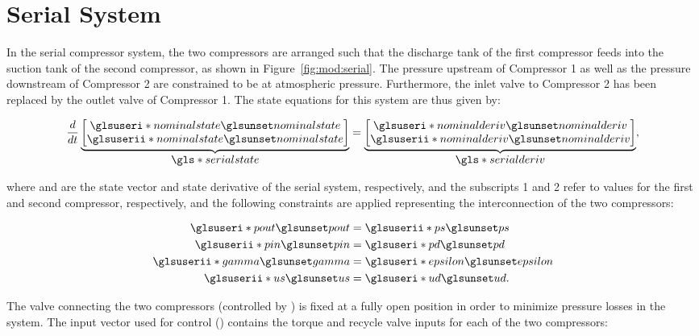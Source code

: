 \section{Serial System}
\label{sec:mod:serial}

In the serial compressor system, the two compressors are arranged such that the discharge tank of the first compressor feeds into the suction tank of the second compressor, as shown in Figure~\ref{fig:mod:serial}.
The pressure upstream of Compressor 1 as well as the pressure downstream of Compressor 2 are constrained to be at atmospheric pressure.
Furthermore, the inlet valve to Compressor 2 has been replaced by the outlet valve of Compressor 1. The state equations for this system are thus given by:

\begin{equation}
  \dt{}
  \ubrace{\begin{bmatrix}
    \gi{nominalstate}\\
    \gii{nominalstate}\\
  \end{bmatrix}}{\g{serialstate}} =
  \ubrace{\begin{bmatrix}
    \gi{nominalderiv}\\
    \gii{nominalderiv}
  \end{bmatrix}}{\g{serialderiv}},
  \label{eq:mod:serial-state-eq}
\end{equation}

\noindent where  and  are the state vector and state derivative of the serial system, respectively, and the subscripts 1 and 2 refer to values for the first and second compressor, respectively, and the following constraints are applied representing the interconnection of the two compressors:

\begin{equation}
  \begin{split}
    \gi{pout} & = \gii{ps}\\
    \gii{pin} & = \gi{pd}\\
    \gii{gamma} & = \gi{epsilon}\\
    \gii{us} & = \gi{ud}.
  \end{split}
  \label{eq:mod:serial-constraints}
\end{equation}

The valve connecting the two compressors (controlled by ) is fixed at a fully open position in order to minimize pressure losses in the system.
The input vector used for control () contains the torque and recycle valve inputs for each of the two compressors:


